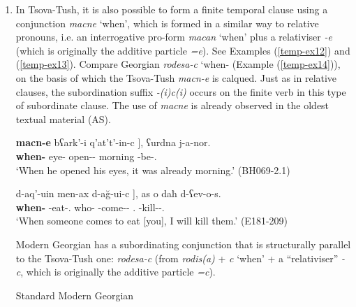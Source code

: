 \begin{enumerate}[label=\Roman*.]
\begin{exe}
\begin{xlist}
	\end{xlist}
\end{exe}



\item In Tsova-Tush, it is also possible to form a finite temporal clause using a conjunction \textit{macne} ‘when’, which is formed in a similar way to relative pronouns, i.e. an interrogative pro-form \textit{macan} ‘when’ plus a relativiser \textit{-e} (which is originally the additive particle \textit{=e}). See Examples (\ref{temp-ex12}) and (\ref{temp-ex13}). Compare Georgian \textit{rodesa-c} ‘when-{\Rel} (Example (\ref{temp-ex14})), on the basis of which the Tsova-Tush \textit{macn-e} is calqued. Just as in relative clauses, the subordination suffix \textit{-(i)c(i)} occurs on the finite verb in this type of subordinate clause. The use of \textit{macne} is already observed in the oldest textual material (AS).


	\begin{exe}
		\ex\label{temp-ex12}
		\gll {{\normalfont[} ħal}	\textbf{macn-e}	bʕark'-i	{q'at't'-in-c {\normalfont]}},	ʕurdna	j-a-nor.    \\
		{\Pv}	\textbf{when-{\Rel}}	eye-{\Pl}	open-{\Aor}-{\Subord}	morning	{\J}-be-{\Nw}.{\Rem}    \\
		\trans `When he opened his eyes, it was already morning.’
		\hfill (BH069-2.1)
	\end{exe}



	\begin{exe}
		\ex\label{temp-ex13}
		\gll {{\normalfont[} \textbf{macn-e}}	d-aq'-uin	men-ax	{d-a\u{g}-ui-c {\normalfont]}},	as	o	daħ	d-ʕev-o-s.    \\
		\textbf{when-{\Rel}}	{\D}-eat-{\Ptcp}.{\Npst}	who-{\Indf}	{\D}-come-{\Npst}-{\Subord}	{\Fsg}.{\Erg}	{\Dist}	{\Pv}	{\D}-kill-{\Npst}-{\Fsg}.{\Erg} \\
		\trans `When someone comes to eat [you], I will kill them.’
		\hfill (E181-209)
	\end{exe}


Modern Georgian has a subordinating conjunction that is structurally parallel to the Tsova-Tush one: \textit{rodesa-c} (from \textit{rodis(a)} + \textit{c} ‘when’ + a “relativiser” \textit{-c}, which is originally the additive particle \textit{=c}).


	\begin{exe}
		\ex\label{temp-ex14}
		Standard Modern Georgian
     

\end{exe}
\end{enumerate}
